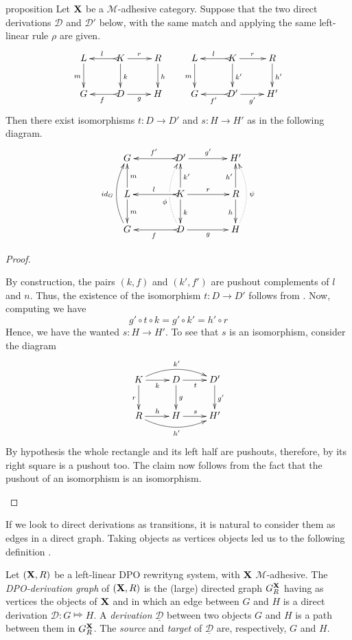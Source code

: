 \documentclass[a4paper,UKenglish,cleveref,pdftex, thm-restate,numberwithinsect]{lipics}
\newcommand{\id}[1]{\mathsf{id}_{#1}}
\def\R{\mathsf{R}}
\def\X{\textbf {\textup{X}}}
\newcommand{\dder}[1]{\mathscr{#1}}
\newcommand{\der}[1]{\underline{\dder{#1}}}
\def\gpo{\mathsf{G}^{\X}_R}
\begin{document}
\begin{theoremEnd}[category=sec2]{proposition}\label{prop:unique} Let $\X$  be a $\mathcal{M}$-adhesive category. Suppose that the two direct derivations $\mathscr{D}$ and $\mathscr{D'}$ below, with the same match and applying the same left-linear rule $\rho$ are given.
	\[\xymatrix{L \ar[d]_{m}& K \ar[d]^{k}\ar@{>->}[l]_{l} \ar[r]^{r} & R \ar[d]^{h} & L \ar[d]_{m}& K \ar[d]^{k'}\ar@{>->}[l]_{l} \ar[r]^{r} & R \ar[d]^{h'}\\G & \ar@{>->}[l]^{f} D \ar[r]_{g}& H & G & \ar@{>->}[l]^{f'} D' \ar[r]_{g'}& H'}\]
	Then there exist isomorphisms $t\colon D\to D'$ and $s\colon H\to H'$ as in the following diagram.
	\[\xymatrix@C=40pt{G&D' \ar[r]^{g'} \ar@{>->}[l]_{f'}&H'\\ L \ar[d]^{m} \ar[u]_{m} & K \ar[u]_{k'} \ar[d]^{k}\ar[r]^{r} \ar@{>->}[l]_{l} &R\ar[u]^{h'} \ar[d]_{h}\\G\ar@/^.4cm/[uu]^{\id{G}}&D\ar@{>->}[l]^{f}\ar@/^.4cm/@{.>}[uu]^(.4){\phi}|\hole \ar[r]_{g}&H\ar@/_.4cm/@{.>}[uu]_{\psi}}\]
\end{theoremEnd}
\begin{proof}\begin{proofEnd}
	By construction, the pairs $(k, f)$ and $(k', f')$ are pushout complements of $l$ and $n$. Thus, the existence of the isomorphism $t\colon D\to D'$ follows from . Now, computing we have
\[
g'\circ t \circ k= g' \circ k'=h'\circ r\]
	Hence, we have the wanted $s\colon H\to H'$. To see that $s$ is an isomorphism, consider the diagram 
	\[\xymatrix{K  \ar@/^.4cm/[rr]^{k'}\ar[d]_{r} \ar[r]_{k}& \ar[r]_{t} D \ar[d]^{g}& D' \ar[d]^{g'}\\ R \ar@/_.4cm/[rr]_{h'} \ar[r]^{h}& H \ar[r]^{s}& H'}\]
	By hypothesis the whole rectangle and its left half are pushouts, therefore, by  its right square is a pushout too. The claim now follows from the fact that the pushout of an isomorphism is an isomorphism.
	\end{proofEnd}
\end{proof}



If we look to direct derivations as transitions, it is natural to consider them as edges in a direct graph. Taking objects as vertices objects led us to the following definition \cite{heindel2009category}.

\begin{definition}
	Let $(\X, \R)$ be a left-linear DPO rewrityng system, with $\X$ $\mathcal{M}$-adhesive. The \emph{DPO-derivation graph} of $(\X, \R)$ is the (large)  directed graph $\gpo$ having as vertices the objects of $\X$ and in which an edge between $G$ and $H$ is a direct derivation $\dder{D}\colon G\Mapsto H$.	A \emph{derivation} $\der{D}$ between two objects $G$ and $H$ is a path between them in $\gpo$. The \emph{source} and \emph{target} of $\der{D}$ are, respectively, $G$ and $H$.
\end{definition}
\end{document}
